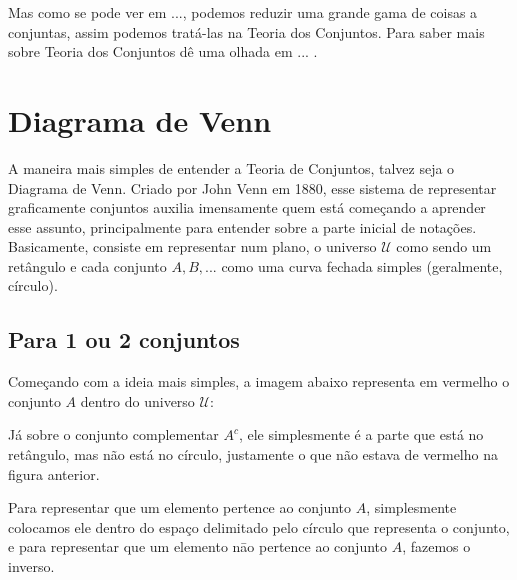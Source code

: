     Mas como se pode ver em ..., podemos reduzir uma grande gama de coisas a conjuntas, assim podemos tratá-las na Teoria dos Conjuntos. Para saber mais sobre Teoria dos Conjuntos dê uma olhada em ... .

    \section{Diagrama de Venn}
    A maneira mais simples de entender a Teoria de Conjuntos, talvez seja o Diagrama de Venn. Criado por John Venn em 1880, esse sistema de representar graficamente conjuntos auxilia imensamente quem está começando a aprender esse assunto, principalmente para entender sobre a parte inicial de notações. Basicamente, consiste em representar num plano, o universo $\mathcal U$ como sendo um retângulo e cada conjunto $A,B,...$ como uma curva fechada simples (geralmente, círculo).
    
    \subsection{Para 1 ou 2 conjuntos}
    Começando com a ideia mais simples, a imagem abaixo representa em vermelho o conjunto $A$ dentro do universo $\mathcal U$:
    
    
    Já sobre o conjunto complementar $A^c$, ele simplesmente é a parte que está no retângulo, mas não está no círculo, justamente o que não estava de vermelho na figura anterior.
    
    
    Para representar que um elemento pertence ao conjunto $A$, simplesmente colocamos ele dentro do espaço delimitado pelo círculo que representa o conjunto, e para representar que um elemento nāo pertence ao conjunto $A$, fazemos o inverso.
    
    
    
